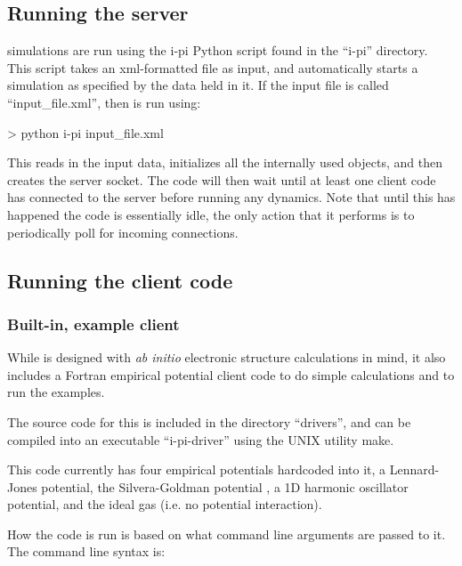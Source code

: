 \documentclass[11pt,english,fleqn]{report}
\newenvironment{code}{%
\footnotesize 
\verbatim
}{
\endverbatim
\normalsize
}
\begin{document}
\subsection{Running the \ipi server}

\label{runningsimulations}

\ipi simulations are run using the i-pi Python script found in the
{}``i-pi'' directory. This script takes an xml-formatted file as
input, and automatically starts a simulation as specified by the data
held in it. If the input file is called {}``input\_file.xml'', then
\ipi is run using:

\begin{code}
> python i-pi input_file.xml
\end{code}

This reads in the input data, initializes all the internally used
objects, and then creates the server socket. The code will then wait
until at least one client code has connected to the server before
running any dynamics. Note that until this has happened the code is
essentially idle, the only action that it performs is to periodically
poll for incoming connections.


\subsection{Running the client code}

\label{runningclients}

\subsubsection{Built-in, example client}

\label{driver.x}

While \ipi is designed with \emph{ab initio} electronic structure calculations
in mind, it also includes a Fortran empirical potential client code to do 
simple calculations and to run the examples.

The source code for this is included in the directory {}``drivers'', and can
be compiled into an executable {}``i-pi-driver'' using the UNIX utility make.

This code currently has four empirical potentials hardcoded into it, 
a Lennard-Jones potential, the Silvera-Goldman potential \cite{silv-gold78jcp},
a 1D harmonic oscillator potential, and the ideal gas (i.e. no potential
interaction).

How the code is run is based on what command line arguments are passed to it.
The command line syntax is:
\end{document}
